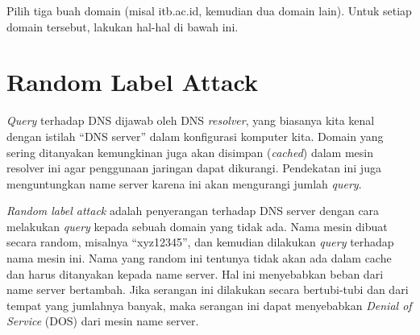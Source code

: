\begin{mdframed}[backgroundcolor=blue!20,linewidth=0pt,innerrightmargin=50pt]
   \begin{ExerciseList}
      \Exercise[title=Eksplorasi DNS.] 

      { } Pilih tiga buah domain (misal itb.ac.id,
      kemudian dua domain lain). Untuk setiap domain tersebut, lakukan
      hal-hal di bawah ini.
   \end{ExerciseList}
   
   \end{mdframed}

\section{Random Label Attack}
{\em Query} terhadap DNS dijawab oleh DNS {\em resolver}, yang biasanya kita
kenal dengan istilah ``DNS server'' dalam konfigurasi komputer kita. Domain
yang sering ditanyakan kemungkinan juga akan disimpan ({\em cached}) dalam
mesin resolver ini agar penggunaan jaringan dapat dikurangi. Pendekatan ini
juga menguntungkan name server karena ini akan mengurangi jumlah {\em query}.

{\em Random label attack} adalah penyerangan terhadap DNS server dengan cara
melakukan {\em query} kepada sebuah domain yang tidak ada.
Nama mesin dibuat secara random, misalnya ``xyz12345'',
dan kemudian dilakukan {\em query} terhadap nama mesin ini.
Nama yang random ini tentunya tidak akan ada dalam cache dan harus 
ditanyakan kepada name server. Hal ini
menyebabkan beban dari name server bertambah. Jika serangan ini dilakukan
secara bertubi-tubi dan dari tempat yang jumlahnya banyak, maka serangan ini
dapat menyebabkan {\em Denial of Service} (DOS) dari mesin name server.
